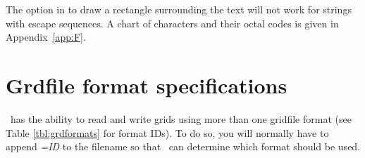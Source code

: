 The option in  to draw a rectangle surrounding the text
will not work for strings with escape sequences.  A chart of characters
and their octal codes is given in Appendix~\ref{app:F}. 

\section{Grdfile format specifications}
\label{sec:grdformats}
\GMT\ has the ability to read and write grids using more than one gridfile
format (see Table \ref{tbl:grdformats} for format IDs).  To do so, you will normally have
to append \emph{=ID} to the filename so that \GMT\ can determine which format
should be used.
